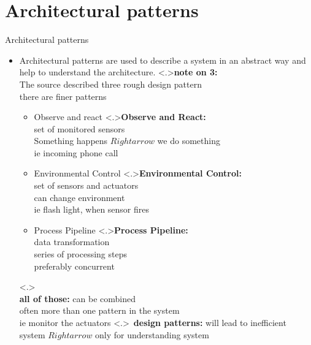 \documentclass[ngerman={babel}, utf8, bigger, xcolor={table,dvipsnames}, ompress, hyperref={bookmarks,colorlinks}]{beamer}
\begin{document}
\section{Architectural patterns}
\begin{frame}{Architectural patterns}
	\begin{itemize}
		\item Architectural patterns are used to describe a system in an abstract way and help to understand the architecture.
		\note<.>{\textbf{note on 3:}\\ The source described three rough design pattern \\ there are finer patterns}
		\begin{itemize}
			\item Observe and react
			\note<.>{\textbf{Observe and React:}\\ set of monitored sensors \\ Something happens $Rightarrow$ we do something \\ ie incoming phone call}
			\item Environmental Control
			\note<.>{\textbf{Environmental Control:}\\ set of sensors and actuators \\ can change environment \\ ie flash light, when sensor fires}
			\item Process Pipeline
			\note<.>{\textbf{Process Pipeline:}\\ data transformation \\ series of processing steps\\ preferably concurrent}
		\end{itemize}
		\note<.>{\\ \textbf{all of those:} can be combined \\ often more than one pattern in the system \\ ie monitor the actuators}
		\note<.>{\ \textbf{design patterns:} will lead to inefficient system $Rightarrow$ only for understanding system}
		\end{itemize}
\end{frame}
\end{document}
